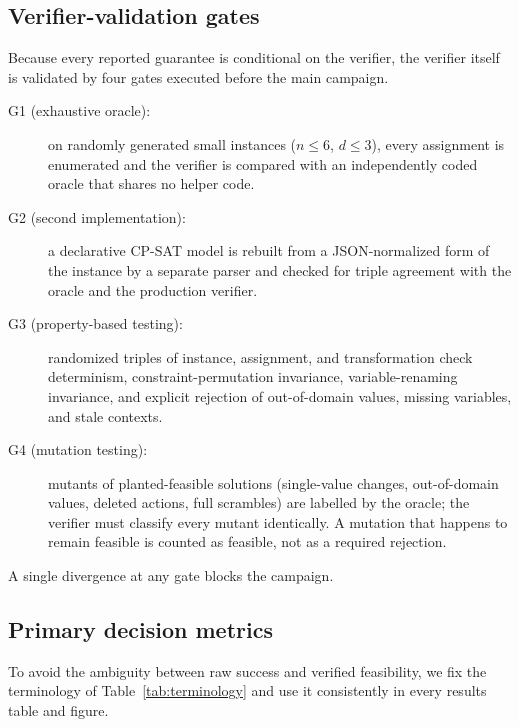 \documentclass[pdflatex,sn-mathphys-num,iicol,oneside]{sn-jnl}
\begin{document}
\subsection{Verifier-validation gates}
\label{sec:gates-method}

Because every reported guarantee is conditional on the verifier, the
verifier itself is validated by four gates executed before the main
campaign.

\begin{description}
    \item[G1 (exhaustive oracle):] on randomly generated small
    instances ($n\le 6$, $d\le 3$), every assignment is enumerated and
    the verifier is compared with an independently coded oracle that
    shares no helper code.
    \item[G2 (second implementation):] a declarative CP-SAT model is
    rebuilt from a JSON-normalized form of the instance by a separate
    parser and checked for triple agreement with the oracle and the
    production verifier.
    \item[G3 (property-based testing):] randomized triples of instance,
    assignment, and transformation check determinism,
    constraint-permutation invariance, variable-renaming invariance,
    and explicit rejection of out-of-domain values, missing variables,
    and stale contexts.
    \item[G4 (mutation testing):] mutants of planted-feasible solutions
    (single-value changes, out-of-domain values, deleted actions, full
    scrambles) are labelled by the oracle; the verifier must classify
    every mutant identically. A mutation that happens to remain
    feasible is counted as feasible, not as a required rejection.
\end{description}

A single divergence at any gate blocks the campaign.

\subsection{Primary decision metrics}

To avoid the ambiguity between raw success and verified feasibility,
we fix the terminology of Table~\ref{tab:terminology} and use it
consistently in every results table and figure.
\end{document}

